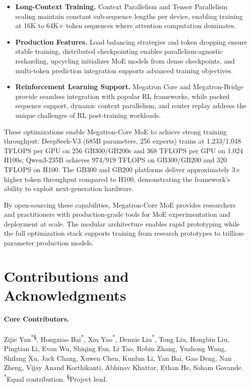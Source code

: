 \begin{itemize}
    \item \textbf{Long-Context Training.} Context Parallelism and Tensor Parallelism scaling maintain constant sub-sequence lengths per device, enabling training at 16K to 64K+ token sequences where attention computation dominates.

    \item \textbf{Production Features.} Load balancing strategies and token dropping ensure stable training, distributed checkpointing enables parallelism-agnostic resharding, upcycling initializes MoE models from dense checkpoints, and multi-token prediction integration supports advanced training objectives.

    \item \textbf{Reinforcement Learning Support.} Megatron Core and Megatron-Bridge provide seamless integration with popular RL frameworks, while packed sequence support, dynamic context parallelism, and router replay address the unique challenges of RL post-training workloads.
\end{itemize}

These optimizations enable Megatron-Core MoE to achieve strong training throughput: DeepSeek-V3 (685B parameters, 256 experts) trains at 1,233/1,048 TFLOPS per GPU on 256 GB300/GB200s and 368 TFLOPS per GPU on 1,024 H100s; Qwen3-235B achieves 974/919 TFLOPS on GB300/GB200 and 320 TFLOPS on H100. The GB300 and GB200 platforms deliver approximately 3$\times$ higher token throughput compared to H100, demonstrating the framework's ability to exploit next-generation hardware.

By open-sourcing these capabilities, Megatron-Core MoE provides researchers and practitioners with production-grade tools for MoE experimentation and deployment at scale. The modular architecture enables rapid prototyping while the full optimization stack supports training from research prototypes to trillion-parameter production models.


\section*{Contributions and Acknowledgments}
\label{sec:contributions}


\paragraph{Core Contributors.}
Zijie Yan\textsuperscript{*\S}, Hongxiao Bai\textsuperscript{*}, Xin Yao\textsuperscript{*}, Dennis Liu\textsuperscript{*}, Tong Liu, Hongbin Liu, Pingtian Li, Evan Wu, Shiqing Fan, Li Tao, Robin Zhang, Yuzhong Wang, Shifang Xu, Jack Chang, Xuwen Chen, Kunlun Li, Yan Bai, Gao Deng, Nan Zheng, Vijay Anand Korthikanti, Abhinav Khattar, Ethan He, Soham Govande.\\
{\small \textsuperscript{*}Equal contribution. \textsuperscript{\S}Project lead.}

